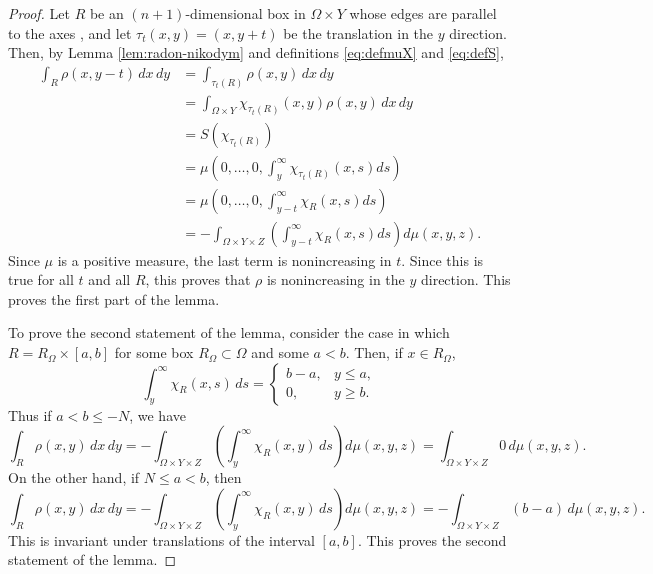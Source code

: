 \documentclass{article}
\theoremstyle{definition}
\theoremstyle{remark}
\begin{document}
%
\begin{proof}
Let $R$ be an $(n+1)$-dimensional box in $\Omega\times Y$ whose edges are parallel to the axes%
 , and let $\tau_t(x,y)=(x,y+t)$ be the translation in the $y$ direction. Then, by Lemma \ref{lem:radon-nikodym} and definitions \eqref{eq:defmuX} and \eqref{eq:defS},
 \begin{align*}
 \int_{R} \rho(x,y-t)\,dx\,dy&=\int_{\tau_t(R)} \rho(x,y)\,dx\,dy\\
 &=\int_{\Omega\times Y} \chi_{\tau_t(R)}(x,y)\rho(x,y)\,dx\,dy\\
 &=S(\chi_{\tau_t(R)})\\
 &=\mu\left(0,\dots,0,\int_{y}^\infty\chi_{\tau_t(R)}(x,s)ds\right)\\
 &=\mu\left(0,\dots,0,\int_{y-t}^{\infty}\chi_{R}(x,s)ds\right)\\
 &=-\int_{\Omega\times Y\times Z}\left(\int_{y-t}^{\infty}\chi_R(x,s)ds\right)d\mu(x,y,z).
 \end{align*}
 Since $\mu$ is a positive measure, the last term is nonincreasing in $t$. Since this is true for all $t$ and all $R$, this proves that $\rho$ is nonincreasing in the $y$ direction. This proves the first part of the lemma.
 
 To prove the second statement of the lemma, consider the case in which $R=R_\Omega\times[a,b]$ for some box $R_\Omega\subset \Omega$ and some $a<b$. Then, if $x\in R_\Omega$,
 \[\int_y^\infty\chi_R(x,s)\,ds=\begin{cases}
  b-a, &y\leq a,\\
  0,&y\geq b.
 \end{cases}
 \]
 Thus if $a<b\leq -N$, we have
 \[\int_R\rho(x,y)\,dx\,dy=-\int_{\Omega\times Y\times Z}\left(\int_y^\infty\chi_R(x,y)\,ds\right)d\mu(x,y,z)=\int_{\Omega\times Y\times Z}0\,d\mu(x,y,z).\]
 On the other hand, if $N\leq a<b$, then
  \[\int_R\rho(x,y)\,dx\,dy=-\int_{\Omega\times Y\times Z}\left(\int_y^\infty\chi_R(x,y)\,ds\right)d\mu(x,y,z)=-\int_{\Omega\times Y\times Z}(b-a)\,d\mu(x,y,z).\]
 This is invariant under translations of the interval $[a,b]$.
 This proves the second statement of the lemma.
\end{proof}
\end{document}
